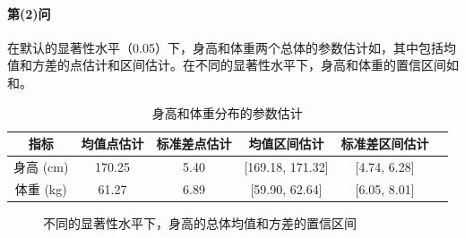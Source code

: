 \paragraph{第(2)问} 在默认的显著性水平（0.05）下，身高和体重两个总体的参数估计如，其中包括均值和方差的点估计和区间估计。在不同的显著性水平下，身高和体重的置信区间如和。

\begin{table}[H]
    \centering
    \caption{身高和体重分布的参数估计}
    \label{tab:ex6_normfit}
    \begin{tabular}{c|ccccc}
        \toprule
        指标 & 均值点估计 & 标准差点估计 & 均值区间估计 &
        标准差区间估计\tabularnewline
        \midrule
        身高 (cm) & 170.25 & 5.40 & [169.18, 171.32] & [4.74,
        6.28]\tabularnewline
        体重 (kg) & 61.27 & 6.89 & [59.90, 62.64] & [6.05,
        8.01]\tabularnewline
        \bottomrule
    \end{tabular}
\end{table}

\begin{figure}[t]
    \centering
    \caption{不同的显著性水平下，身高的总体均值和方差的置信区间}
    \label{fig:ex6_height_alpha}
\end{figure}

